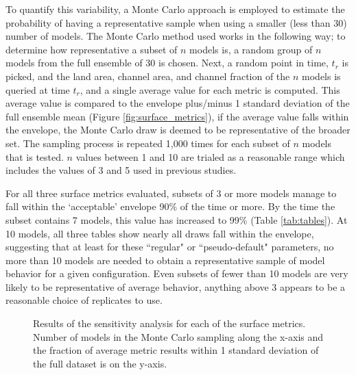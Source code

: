 To quantify this variability, a Monte Carlo approach is employed to estimate the probability of having a representative sample when using a smaller (less than 30) number of models.
The Monte Carlo method used works in the following way; to determine how representative a subset of $n$ models is, a random group of $n$ models from the full ensemble of 30 is chosen.
Next, a random point in time, $t_r$ is picked, and the land area, channel area, and channel fraction of the $n$ models is queried at time $t_r$, and a single average value for each metric is computed.
This average value is compared to the envelope plus/minus 1 standard deviation of the full ensemble mean (Figure \ref{fig:surface_metrics}), if the average value falls within the envelope, the Monte Carlo draw is deemed to be representative of the broader set.
The sampling process is repeated 1,000 times for each subset of $n$ models that is tested.
$n$ values between 1 and 10 are trialed as a reasonable range which includes the values of 3 and 5 used in previous studies.

For all three surface metrics evaluated, subsets of 3 or more models manage to fall within the `acceptable' envelope 90\% of the time or more. 
By the time the subset contains 7 models, this value has increased to 99\% (Table \ref{tab:tables}).
At 10 models, all three tables show nearly all draws fall within the envelope, suggesting that at least for these ``regular" or ``pseudo-default" parameters, no more than 10 models are needed to obtain a representative sample of model behavior for a given configuration.
Even subsets of fewer than 10 models are very likely to be representative of average behavior, anything above 3 appears to be a reasonable choice of replicates to use.

\begin{figure}[!htbp]
	\caption{Results of the sensitivity analysis for each of the surface metrics. Number of models in the Monte Carlo sampling along the x-axis and the fraction of average metric results within 1 standard deviation of the full dataset is on the y-axis.}
	\label{fig:MC_results}
\end{figure}

